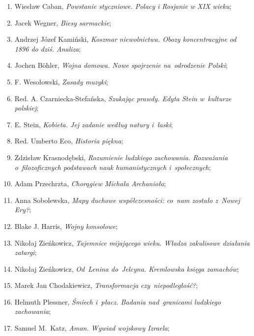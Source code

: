 \documentclass[a4paper,11pt]{article}
\begin{document}
\begin{enumerate}
\item Wiesław Caban, \emph{Powstanie styczniowe. Polacy i Rosjanie w
    XIX wieku};

\item Jacek Wegner, \emph{Biesy sarmackie};

\item Andrzej Józef Kamiński, \emph{Koszmar niewolnictwa. Obozy
    koncentracyjne od 1896 do dziś. Analiza};

\item Jochen B\"{o}hler, \emph{Wojna domowa. Nowe spojrzenie
    na~odrodzenie Polski};

\item F. Wesołowski, \emph{Zasady muzyki};

\item Red. A. Czarniecka-Stefańska, \emph{Szukając prawdy. Edyta Stein
    w~kulturze polskiej};

\item E. Stein, \emph{Kobieta. Jej zadanie według natury i~łaski};

\item Red. Umberto Eco, \emph{Historia piękna};

\item Zdzisław Krasnodębski, \emph{Rozumienie ludzkiego zachowania.
    Rozważania o~filozoficznych podstawach nauk humanistycznych
    i~społecznych};

\item Adam Przechrzta, \emph{Chorągiew Michała Archanioła};

\item Anna Sobolewska, \emph{Mapy duchowe współczesności: co~nam
    zostało z~Nowej Ery?};

\item Blake J. Harris, \emph{Wojny konsolowe};

\item Nikołaj Zieńkowicz, \emph{Tajemnice mijającego wieku. Władza
    zakulisowe działania zatargi};

\item Nikołaj Zieńkowicz, \emph{Od~Lenina do~Jelcyna. Kremlowska
    księga zamachów};

\item Marek Jan Chodakiewicz, \emph{Transformacja czy~niepodległość?};

\item Helmuth Plessner, \emph{Śmiech i~płacz. Badania nad~granicami
    ludzkiego zachowania};

\item Samuel M.~Katz, \emph{Aman. Wywiad wojskowy Izraela};


\end{enumerate}
\end{document}
